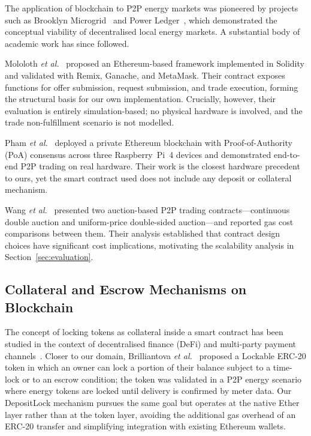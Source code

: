 \documentclass{IEEEoj}
\begin{document}
The application of blockchain to P2P energy markets was pioneered by
projects such as Brooklyn Microgrid~\cite{mengelkamp2018blockchain} and
Power Ledger~\cite{powerledger2017}, which demonstrated the conceptual
viability of decentralised local energy markets.
A substantial body of academic work has since followed.

Mololoth \textit{et al.}~\cite{mololoth2022p2p} proposed an Ethereum-based
framework implemented in Solidity and validated with Remix, Ganache, and
MetaMask.
Their contract exposes functions for offer submission, request submission,
and trade execution, forming the structural basis for our own implementation.
Crucially, however, their evaluation is entirely simulation-based; no
physical hardware is involved, and the trade non-fulfillment scenario is not
modelled.

Pham \textit{et al.}~\cite{pham2021raspi} deployed a private Ethereum
blockchain with Proof-of-Authority (PoA) consensus across three Raspberry~Pi~4
devices and demonstrated end-to-end P2P trading on real hardware.
Their work is the closest hardware precedent to ours, yet the smart contract
used does not include any deposit or collateral mechanism.

Wang \textit{et al.}~\cite{wang2021double} presented two auction-based
P2P trading contracts---continuous double auction and uniform-price
double-sided auction---and reported gas cost comparisons between them.
Their analysis established that contract design choices have significant
cost implications, motivating the scalability analysis in
Section~\ref{sec:evaluation}.

\subsection{Collateral and Escrow Mechanisms on Blockchain}

The concept of locking tokens as collateral inside a smart contract has been
studied in the context of decentralised finance (DeFi) and multi-party
payment channels~\cite{poon2016lightning}.
Closer to our domain, Brilliantova \textit{et al.}~\cite{brilliantova2022lockable}
proposed a Lockable ERC-20 token in which an owner can lock a portion of their
balance subject to a time-lock or to an escrow condition; the token was
validated in a P2P energy scenario where energy tokens are locked until
delivery is confirmed by meter data.
Our DepositLock mechanism pursues the same goal but operates at the native
Ether layer rather than at the token layer, avoiding the additional gas
overhead of an ERC-20 transfer and simplifying integration with existing
Ethereum wallets.
\end{document}
